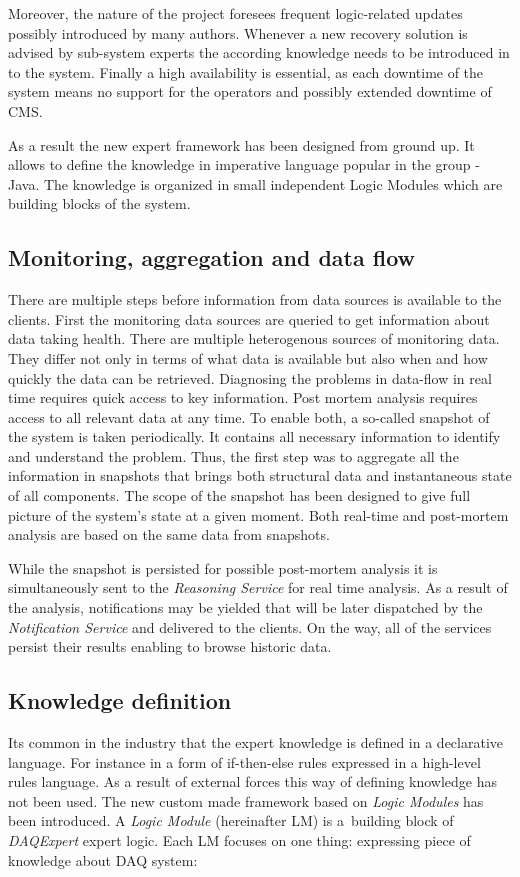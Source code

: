 \documentclass[a4paper]{jpconf}
\begin{document}
Moreover, the nature of the project foresees frequent logic-related updates possibly introduced by many authors. Whenever a new recovery solution is advised by sub-system experts the according knowledge needs to be introduced in to the system. Finally a high availability is essential, as each downtime of the system means no support for the operators and possibly extended downtime of CMS. 

As a result the new expert framework has been designed from ground up. It allows to define the knowledge in imperative language popular in the group - Java. The knowledge is organized in small independent Logic Modules which are building blocks of the system.


\subsection{Monitoring, aggregation and data flow}

There are multiple steps before information from data sources is available to the clients. First the monitoring data sources are queried to get information about data taking health. There are multiple heterogenous sources of monitoring data. They differ not only in terms of what data is available but also when and how quickly the data can be retrieved. Diagnosing the problems in data-flow in real time requires quick access to key information. Post mortem analysis requires access to all relevant data at any time. To enable both, a so-called snapshot of the system is taken periodically. It contains all necessary information to identify and understand the problem. Thus, the first step was to aggregate all the information in snapshots that brings both structural data and instantaneous state of all components. The scope of the snapshot has been designed to give full picture of the system's state at a given moment. Both real-time and post-mortem analysis are based on the same data from snapshots.

While the snapshot is persisted for possible post-mortem analysis it is simultaneously sent to the {\it Reasoning Service} for real time analysis. As a result of the analysis, notifications may be yielded that will be later dispatched by the {\it Notification Service} and delivered to the clients. On the way, all of the services persist their results enabling to browse historic data.


\subsection{Knowledge definition}
Its common in the industry that the expert knowledge is defined in a declarative language. For instance in a form of if-then-else rules expressed in a high-level rules language. As a result of external forces this way of defining knowledge has not been used. The new custom made framework based on {\it Logic Modules} has been introduced. A {\it Logic Module} (hereinafter LM) is a~building block of {\it DAQExpert} expert logic. Each LM focuses on one thing: expressing piece of knowledge about DAQ system:
\end{document}
